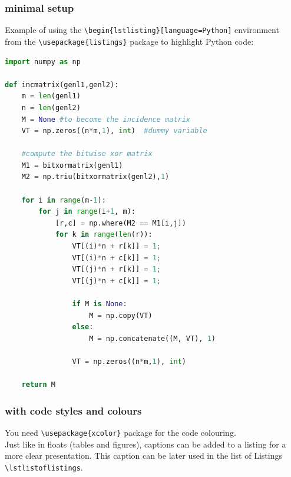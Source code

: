 \documentclass[letterpaper,dvipsnames]{article}
\begin{document}
\subsubsection{minimal setup}

Example of using the \verb+\begin{lstlisting}[language=Python]+ 
environment \\
from the \verb+\usepackage{listings}+ package to highlight Python code:

\begin{lstlisting}[language=Python]
import numpy as np
    
def incmatrix(genl1,genl2):
    m = len(genl1)
    n = len(genl2)
    M = None #to become the incidence matrix
    VT = np.zeros((n*m,1), int)  #dummy variable
    
    #compute the bitwise xor matrix
    M1 = bitxormatrix(genl1)
    M2 = np.triu(bitxormatrix(genl2),1) 
    
    for i in range(m-1):
        for j in range(i+1, m):
            [r,c] = np.where(M2 == M1[i,j])
            for k in range(len(r)):
                VT[(i)*n + r[k]] = 1;
                VT[(i)*n + c[k]] = 1;
                VT[(j)*n + r[k]] = 1;
                VT[(j)*n + c[k]] = 1;
    
                if M is None:
                    M = np.copy(VT)
                else:
                    M = np.concatenate((M, VT), 1)
    
                VT = np.zeros((n*m,1), int)
    
    return M
\end{lstlisting}

\subsubsection{with code styles and colours}

You need \verb+\usepackage{xcolor}+ package for the code colouring. \\
Just like in floats (tables and figures), captions can be added to a 
listing for a more clear presentation. This caption can be later used 
in the list of Listings \verb+\lstlistoflistings+.
\end{document}
